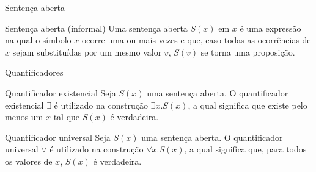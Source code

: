 \begin{frame}[fragile]{Sentença aberta}

    \begin{block}{Sentença aberta (informal)}
        Uma sentença aberta $S(x)$ em $x$ é uma expressão na qual o símbolo $x$ ocorre uma 
        ou mais vezes e que, caso todas as ocorrências de $x$ sejam substituídas por um 
        mesmo valor $v$, $S(v)$ se torna uma proposição.
    \end{block}

\end{frame}

\begin{frame}[fragile]{Quantificadores}

    \begin{block}{Quantificador existencial}
        Seja $S(x)$ uma sentença aberta. O quantificador existencial $\exists$ é utilizado na construção $\exists x.S(x)$, a qual
        significa que existe pelo menos um $x$ tal que $S(x)$ é verdadeira.
    \end{block}

    \vspace{0.3in}

    \begin{block}{Quantificador universal}
        Seja $S(x)$ uma sentença aberta. O quantificador universal $\forall$ é utilizado na construção $\forall x.S(x)$, a qual
        significa que, para todos os valores de $x$, $S(x)$ é verdadeira.
    \end{block}
\end{frame}
